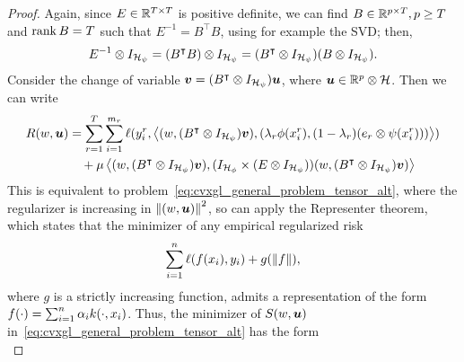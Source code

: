 \begin{proof}
Again, since ${E} \in \mathbb{R}^{T \times T}$ is positive definite, we can find $B \in \mathbb{R}^{p \times T}, p \geq T$ and $\operatorname{rank}{B} = T$ such that $E^{-1} = 
{B^\intercal} {B}$, using for example the SVD;
% 
then,  
$$ E^{-1} \otimes I_{\mathcal{H}_\psi} = (B^\intercal B) \otimes I_{\mathcal{H}_\psi} = (B^\intercal \otimes I_{\mathcal{H}_\psi}) (B \otimes I_{\mathcal{H}_\psi}).$$
%
Consider the change of variable $\bm{v} = (B^\intercal \otimes I_{\mathcal{H}_\psi}) \bm{u}$, where $\bm{u} \in \mathbb{R}^p \otimes \mathcal{H}$. Then we can write
\begin{equation}
    \nonumber
    \begin{aligned}
        R(w, \bm{u}) &= \sum_{r=1}^{T} \sum_{i=1}^{m_r} \ell(y_i^r, \bm{\left\langle} (w, (B^\intercal \otimes I_{\mathcal{H}_\psi}) \bm{v}),  (\lambda_r \phi(x_i^r), (1 - \lambda_r) (e_r \otimes \psi(x_i^r))) \bm{\right\rangle}) \\
        &\quad + \mu \bm{\left\langle} (w, (B^\intercal \otimes I_{\mathcal{H}_\psi})\bm{v}), (I_{\mathcal{H}_\phi} \times (E \otimes I_{\mathcal{H}_\psi})) (w, (B^\intercal \otimes I_{\mathcal{H}_\psi}) \bm{v})  \bm{\right\rangle} \\
    \end{aligned}
\end{equation}
This is equivalent to problem~\eqref{eq:cvxgl_general_problem_tensor_alt}, where the regularizer is increasing in $\left\lVert(w, \bm{u})\right\rVert^2$, so can apply the Representer theorem, which states that the minimizer of any empirical regularized risk 
\begin{equation}
    \nonumber
    \sum_{i=1}^n \ell(f(x_i), y_i) + g(\left\lVert f\right\rVert),
\end{equation}
where $g$ is a strictly increasing function, 
admits a representation of the form $f(\cdot) = \sum_{i=1}^n \alpha_i k(\cdot, x_i)$.
Thus, the minimizer of $S(w, \bm{u})$ in~\eqref{eq:cvxgl_general_problem_tensor_alt} has the form
\begin{equation}

\end{equation}
\end{proof}
